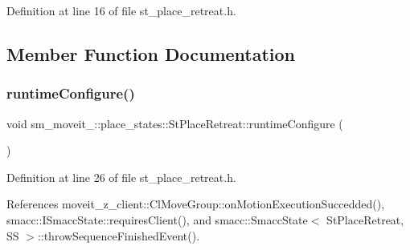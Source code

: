 Definition at line 16 of file st\+\_\+place\+\_\+retreat.\+h.



\subsection{Member Function Documentation}
\mbox{\label{structsm__moveit__2_1_1place__states_1_1StPlaceRetreat_ab3c8e46bce1643ab6ecd415ecf1af6f6}} 
\subsubsection{\texorpdfstring{runtime\+Configure()}{runtimeConfigure()}}
{\footnotesize\ttfamily void sm\+\_\+moveit\+\_\+::place\+\_\+states\+::\+St\+Place\+Retreat\+::runtime\+Configure (\begin{DoxyParamCaption}{ }\end{DoxyParamCaption})\hspace{0.3cm}{\ttfamily [inline]}}



Definition at line 26 of file st\+\_\+place\+\_\+retreat.\+h.



References moveit\+\_\+z\+\_\+client\+::\+Cl\+Move\+Group\+::on\+Motion\+Execution\+Succedded(), smacc\+::\+I\+Smacc\+State\+::requires\+Client(), and smacc\+::\+Smacc\+State$<$ St\+Place\+Retreat, S\+S $>$\+::throw\+Sequence\+Finished\+Event().


